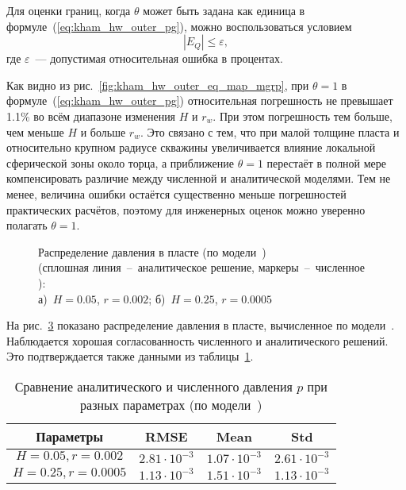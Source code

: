 \documentclass{article}
\begin{document}
Для оценки границ, когда $\theta$ может быть задана как единица в формуле~(\ref{eq:kham_hw_outer_pg}), можно воспользоваться условием
\begin{equation*}
|E_Q| \leq \varepsilon,
\end{equation*}
где $\varepsilon$~--- допустимая относительная ошибка в процентах.

Как видно из рис.~\ref{fig:kham_hw_outer_eq_map_mgrp}, при $\theta=1$
в формуле~(\ref{eq:kham_hw_outer_pg}) относительная погрешность не превышает
1.1\% во всём диапазоне изменения $H$ и $r_w$. При этом погрешность тем
больше, чем меньше $H$ и больше $r_w$. Это связано с тем, что при малой
толщине пласта и относительно крупном радиусе скважины увеличивается влияние
локальной сферической зоны около торца, а приближение $\theta=1$ перестаёт
в полной мере компенсировать различие между численной и аналитической
моделями. Тем не менее, величина ошибки остаётся существенно меньше
погрешностей практических расчётов, поэтому для инженерных оценок можно
уверенно полагать $\theta=1$.

\begin{figure}[!ht]
\centering
\begin{subfigure}{0.48\textwidth}
\centering

\caption{}
\label{fig:kham_hw_outer_p_worst_pg_mgrp}
\end{subfigure}
\hfill
\begin{subfigure}{0.48\textwidth}
\centering

\caption{}
\label{fig:kham_hw_outer_p_best_pg_mgrp}
\end{subfigure}
\caption{
Распределение давления в пласте (по модели~\cite{lit:kham_mazo_uzku_2015}) \\
(сплошная линия~--~аналитическое решение, маркеры~--~численное ): \\
а)~$H = 0.05$, $r = 0.002$;
б)~$H = 0.25$, $r = 0.0005$
}
\label{fig:kham_hw_outer_press_disrt_mgrp}
\end{figure}

На рис.~\ref{fig:kham_hw_outer_press_disrt_mgrp} показано распределение давления в пласте, вычисленное по модели~\cite{lit:kham_mazo_uzku_2015}.
Наблюдается хорошая согласованность численного и аналитического решений. Это подтверждается также данными из таблицы~\ref{tab:kham_hw_outer_p_error_metrics_mgrp}.

\begin{table}[h!]
\centering
\caption{Сравнение аналитического и численного давления $p$ при разных параметрах (по модели~\cite{lit:kham_mazo_uzku_2015})}
\label{tab:kham_hw_outer_p_error_metrics_mgrp}
\begin{tabular}{|c|c|c|c|}
\hline
\textbf{Параметры} & \textbf{RMSE} & \textbf{Mean} & \textbf{Std} \\
\hline
$H=0.05, r=0.002$ & $2.81 \cdot 10^{-3}$ & $1.07 \cdot 10^{-3}$ & $2.61 \cdot 10^{-3}$ \\
\hline
$H=0.25, r=0.0005$ & $1.13 \cdot 10^{-3}$ & $1.51 \cdot 10^{-3}$ & $1.13 \cdot 10^{-3}$ \\
\hline
\end{tabular}
\end{table}
\end{document}
